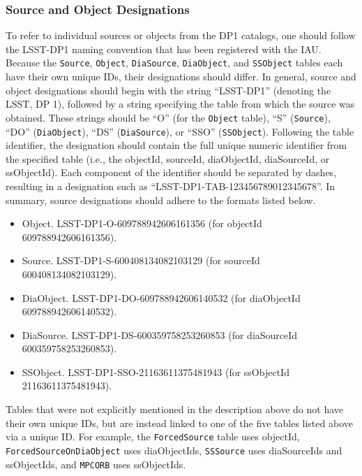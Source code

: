 \subsubsection{Source and Object Designations}\label{ssec:src_naming}
%
To refer to individual sources or objects from the \gls{DP1} catalogs, one should follow the LSST-\gls{DP1} naming convention that has been registered with the \gls{IAU}.
Because the \texttt{Source}, \texttt{Object}, \texttt{DiaSource}, \texttt{DiaObject}, and \texttt{SSObject} tables each have their own unique IDs, their designations should differ.
In general, source and object designations should begin with the string ``LSST-\gls{DP1}'' (denoting the LSST, DP 1), followed by a string specifying the table from which the source was obtained.
These strings should be ``O'' (for the \texttt{Object} table), ``S'' (\texttt{Source}), ``DO'' (\texttt{DiaObject}), ``DS'' (\texttt{DiaSource}), or ``SSO'' (\texttt{SSObject}).
Following the table identifier, the designation should contain the full unique numeric identifier from the specified table (i.e., the objectId, sourceId, diaObjectId, diaSourceId, or ssObjectId).
Each component of the identifier should be separated by dashes, resulting in a designation such as ``LSST-\gls{DP1}-TAB-123456789012345678''.
In summary, source designations should adhere to the formats listed below.

\begin{itemize}
\item Object. LSST-\gls{DP1}-O-609788942606161356 (for objectId 609788942606161356).
\item Source.  LSST-\gls{DP1}-S-600408134082103129 (for sourceId 600408134082103129).
\item DiaObject.  LSST-\gls{DP1}-DO-609788942606140532 (for diaObjectId 609788942606140532).
\item DiaSource.  LSST-\gls{DP1}-DS-600359758253260853 (for diaSourceId 600359758253260853).
\item SSObject.  LSST-\gls{DP1}-SSO-21163611375481943 (for ssObjectId 21163611375481943).
\end{itemize}

Tables that were not explicitly mentioned in the description above do not have their own unique IDs, but are instead linked to one of the five tables listed above via a unique ID.
For example, the \texttt{ForcedSource} table uses objectId, \texttt{ForcedSourceOnDiaObject} uses diaObjectIds, \texttt{SSSource} uses diaSourceIds and ssObjectIds, and \texttt{MPCORB} uses ssObjectIds.

